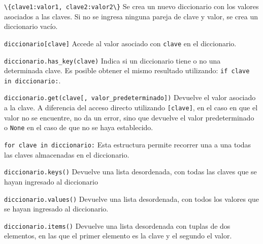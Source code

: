 \begin{referencia_python}

\begin{sintaxis}{\lstinline!\{clave1:valor1, clave2:valor2\}!}
Se crea un nuevo diccionario con los valores asociados a las claves.  Si no
se ingresa ninguna pareja de clave y valor, se crea un diccionario vacío.
\end{sintaxis}

\begin{sintaxis}{\lstinline{diccionario[clave]}}
Accede al valor asociado con \lstinline!clave! en el diccionario.
\end{sintaxis}

\begin{sintaxis}{\lstinline{diccionario.has_key(clave)}}
Indica si un diccionario tiene o no una determinada clave.
Es posible obtener el mismo resultado utilizando:
\lstinline{if clave in diccionario:}.
\end{sintaxis}

\begin{sintaxis}{\lstinline{diccionario.get(clave[, valor_predeterminado])}}
Devuelve el valor asociado a la clave.  A diferencia del acceso directo
utilizando \lstinline{[clave]}, en el caso en que el valor no se
encuentre, no da un error, sino que devuelve el valor predeterminado o
\lstinline{None} en el caso de que no se haya establecido.
\end{sintaxis}

\begin{sintaxis}{\lstinline{for clave in diccionario:}}
Esta estructura permite recorrer una a una todas las claves almacenadas en
el diccionario.
\end{sintaxis}

\begin{sintaxis}{\lstinline{diccionario.keys()}}
Devuelve una lista desordenada, con todas las claves que se hayan ingresado
al diccionario
\end{sintaxis}

\begin{sintaxis}{\lstinline{diccionario.values()}}
Devuelve una lista desordenada, con todos los valores que se hayan
ingresado al diccionario.
\end{sintaxis}

\begin{sintaxis}{\lstinline{diccionario.items()}}
Devuelve una lista desordenada con tuplas de dos elementos, en las que el
primer elemento es la clave y el segundo el valor.
\end{sintaxis}


\end{referencia_python}
